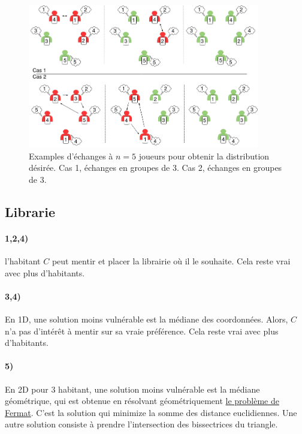 \documentclass[a4paper,10pt,oneside]{article}
\begin{document}
\begin{figure}[!ht]
  \centering
  \includegraphics[width=0.9\textwidth]{figures/indice_traders.png}
  \caption{Examples d'échanges à $n=5$ joueurs pour obtenir la distribution désirée. Cas 1, échanges en groupes de 3. Cas 2, échanges en groupes de 3.}
\end{figure}


\subsection{Librarie}

\paragraph*{1,2,4)} 
l'habitant $C$ peut mentir et placer la librairie où il le souhaite. Cela reste vrai avec plus d'habitants.

\paragraph*{3,4)} 
En 1D, une solution moins vulnérable est la médiane des coordonnées. 
Alors, $C$ n'a pas d'intérêt à mentir sur sa vraie préférence. Cela reste vrai avec plus d'habitants.

\paragraph*{5)} 
En 2D pour 3 habitant, une solution moins vulnérable est la médiane géométrique, qui est obtenue en résolvant géométriquement \href{https://fr.wikipedia.org/wiki/Probl%C3%A8me_de_Weber}{le problème de Fermat}. 
C'est la solution qui minimize la somme des distance euclidiennes.
Une autre solution consiste à prendre l'intersection des bissectrices du triangle.
\end{document}
